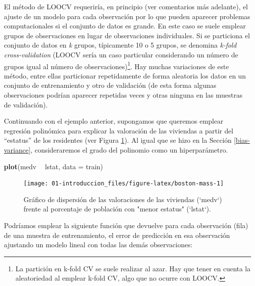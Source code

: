 \documentclass[
  spanish,
]{book}
\newenvironment{Shaded}{\begin{snugshade}}{\end{snugshade}}
\newcommand{\DataTypeTok}[1]{\textcolor[rgb]{0.13,0.29,0.53}{#1}}
\newcommand{\KeywordTok}[1]{\textcolor[rgb]{0.13,0.29,0.53}{\textbf{#1}}}
\newcommand{\NormalTok}[1]{#1}
\newcommand{\OperatorTok}[1]{\textcolor[rgb]{0.81,0.36,0.00}{\textbf{#1}}}
\newcommand{\StringTok}[1]{\textcolor[rgb]{0.31,0.60,0.02}{#1}}
\theoremstyle{break}
\theoremstyle{definition}
\theoremstyle{definition}
\theoremstyle{definition}
\theoremstyle{remark}
\begin{document}
El método de LOOCV requeriría, en principio (ver comentarios más adelante), el ajuste de un modelo para cada observación por lo que pueden aparecer problemas computacionales si el conjunto de datos es grande.
En este caso se suele emplear grupos de observaciones en lugar de observaciones individuales.
Si se particiona el conjunto de datos en \emph{k} grupos, típicamente 10 o 5 grupos, se denomina \emph{k-fold cross-validation} (LOOCV sería un caso particular considerando un número de grupos igual al número de observaciones)\footnote{La partición en k-fold CV se suele realizar al azar. Hay que tener en cuenta la aleatoriedad al emplear k-fold CV, algo que no ocurre con LOOCV.}.
Hay muchas variaciones de este método, entre ellas particionar repetidamente de forma aleatoria los datos en un conjunto de entrenamiento y otro de validación (de esta forma algunas observaciones podrían aparecer repetidas veces y otras ninguna en las muestras de validación).

Continuando con el ejemplo anterior, supongamos que queremos emplear regresión polinómica para explicar la valoración de las viviendas a partir del ``estatus'' de los residentes (ver Figura \ref{fig:boston-mass}).
Al igual que se hizo en la Sección \ref{bias-variance}, consideraremos el grado del polinomio como un hiperparámetro.

\begin{Shaded}
\begin{Highlighting}[]
\KeywordTok{plot}\NormalTok{(medv }\OperatorTok{~}\StringTok{ }\NormalTok{lstat, }\DataTypeTok{data =}\NormalTok{ train)}
\end{Highlighting}
\end{Shaded}

\begin{figure}[!htb]

{\centering \texttt{[image: 01-introduccion\_files/figure-latex/boston-mass-1]} 

}

\caption{Gráfico de dispersión de las valoraciones de las viviendas (`medv`) frente al porcentaje de población con "menor estatus" (`lstat`).}\label{fig:boston-mass}
\end{figure}

Podríamos emplear la siguiente función que devuelve para cada observación (fila) de una muestra de entrenamiento, el error de predicción en esa observación ajustando un modelo lineal con todas las demás observaciones:
\end{document}
